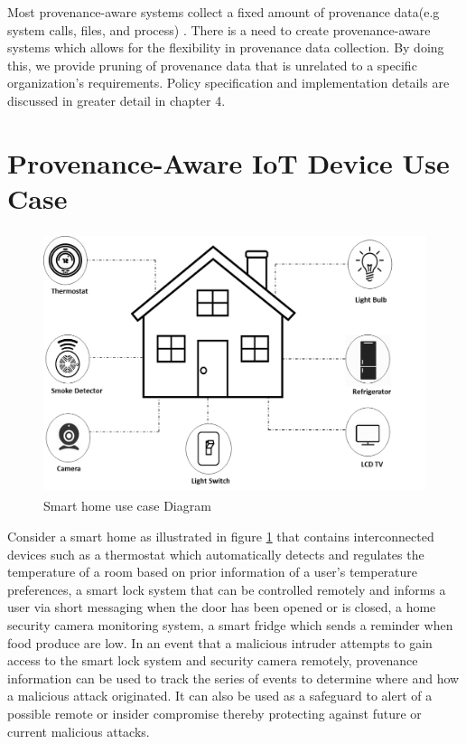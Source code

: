 Most provenance-aware systems collect a fixed amount of provenance data(e.g system calls, files, and process)  \cite{King:2003:BI:945445.945467, altintas,glavic_case_2011}. There is a need to create provenance-aware systems which allows for the flexibility in provenance data collection. By doing this, we provide pruning \cite{braun2006issues} of provenance data that is unrelated to a specific organization's requirements. Policy specification and implementation details are discussed in greater detail in chapter 4.  







\section{Provenance-Aware IoT Device Use Case}

\begin{figure}[h]
\begin{center}
\includegraphics[height=3in]{smart_home_use_case.png}
\end{center}
\caption{Smart home use case Diagram}
\label{smart_home}
\end{figure}


Consider a smart home as illustrated in figure \ref{smart_home} that contains interconnected devices such as a thermostat which automatically detects and regulates the temperature of a room based on prior information of a user's temperature preferences, a smart lock system that can be controlled remotely and informs a user via short messaging when the door has been opened or is closed, a home security camera monitoring system, a smart fridge which sends a reminder when food produce are low. In an event that a malicious intruder attempts  to gain access to the smart lock system and security camera remotely, provenance information can be used to track the series  of events to determine where and how a malicious attack originated. It can also be used as a safeguard to alert of a possible remote or insider compromise thereby protecting against future or current malicious attacks. 





